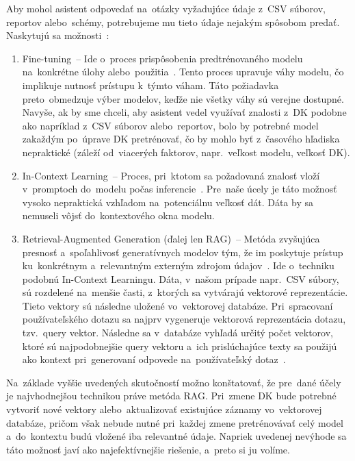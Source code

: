 Aby mohol asistent odpovedať na~otázky vyžadujúce údaje z~CSV súborov, reportov alebo~schémy, potrebujeme mu tieto údaje nejakým spôsobom predať. Naskytujú sa možnosti~\cite{giving-llm-context}:
\begin{enumerate}
\item Fine-tuning~-- Ide o~proces prispôsobenia predtrénovaného modelu na~konkrétne úlohy alebo~použitia~\cite{fine-tuning}. Tento proces upravuje váhy modelu, čo implikuje nutnosť prístupu k~týmto váham. Táto požiadavka preto~obmedzuje výber modelov, keďže nie všetky váhy sú verejne dostupné. Navyše, ak by sme chceli, aby asistent vedel využívať znalosti z~DK podobne ako napríklad z~CSV súborov alebo~reportov, bolo by potrebné model zakaždým po~úprave DK pretrénovať, čo by mohlo byť z~časového hľadiska nepraktické (záleží od~viacerých faktorov, napr.~veľkost modelu, veľkosť DK).

\item In-Context Learning~-- Proces, pri~ktotom sa požadovaná znalosť vloží v~promptoch do~modelu počas inferencie~\cite{in-context-learning}. Pre~naše úcely je táto možnosť vysoko nepraktická vzhľadom na~potenciálnu veľkosť dát. Dáta by sa nemuseli vôjsť do~kontextového okna modelu.

\item Retrieval-Augmented Generation (ďalej len RAG)~-- Metóda zvyšujúca presnosť a~spoľahlivosť generatívnych modelov tým, že im poskytuje prístup ku~konkrétnym a~relevantným externým zdrojom údajov~\cite{rag}. Ide o~techniku podobnú In-Context Learningu. Dáta, v~našom prípade napr.~CSV súbory, sú rozdelené na~menšie časti, z~ktorých sa vytvárajú vektorové reprezentácie. Tieto vektory sú následne uložené vo~vektorovej databáze. Pri~spracovaní používateľského dotazu sa najprv vygeneruje vektorová reprezentácia dotazu, tzv.~query vektor. Následne sa v~databáze vyhľadá určitý počet vektorov, ktoré sú najpodobnejšie query vektoru a~ich prislúchajúce texty sa použijú ako kontext pri~generovaní odpovede na~používateľský dotaz~\cite{vector-dbs-as-context-source}.
\end{enumerate}

Na~základe vyššie uvedených skutočností možno konštatovať, že pre~dané účely je najvhodnejšou technikou práve metóda RAG. Pri~zmene DK bude potrebné vytvoriť nové vektory alebo~aktualizovať existujúce záznamy vo~vektorovej databáze, pričom však nebude nutné pri~každej zmene pretrénovávať celý model a~do~kontextu budú vložené iba relevantné údaje. Napriek uvedenej nevýhode sa táto možnosť javí ako najefektívnejšie riešenie, a~preto si ju volíme.


